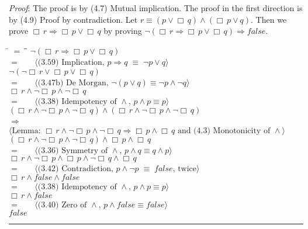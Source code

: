 \documentclass[12pt, fleqn, leqno]{article}
\newcommand{\lgap}{2pt}                             %
\newcommand{\mymathindent}{24pt}                    %
\newcommand{\equivs}{\ensuremath{\;\equiv\;}}       %
\newcommand{\impl}{\ensuremath{\Rightarrow}}        %
\newcommand{\Always}{\Box\,}
\newcommand{\myqed}{\rule[-.23ex]{1.2ex}{2.0ex}}
\newcommand{\myqedtab}{\hspace{384pt}}              %
\newcommand{\Gll} {\langle}                         %
\newcommand{\Ggg} {\rangle}                         %
\newcommand{\Hint}[1]     {\ \ \ $\Gll              \mbox{#1} \Ggg$ }   %
\begin{document}
\emph{Proof}: The proof is by (4.7) Mutual implication.
The proof in the first direction is by (4.9) Proof by contradiction. Let $r \equiv (p \lor \Always q) \land (\Always p \lor q)$.
Then we prove $\Always r \impl \Always p \lor \Always q$ by proving
$\neg (\Always r \impl \Always p \lor \Always q ) \impl false$.

\begin{tabbing}
\hspace{\mymathindent} \= $= \;$ \= \myqedtab \= \kill
  \> \>   $\neg (\Always r \impl \Always p \lor \Always q )$\\[\lgap]
  \> $=$  \>  \Hint{(3.59) Implication, $p\impl q \equivs \neg p \lor q$}\\[\lgap]
 \> \>   $\neg(\neg \Always r \lor \Always p \lor \Always q)$\\[\lgap]
  \> $=$  \>  \Hint{(3.47b) De Morgan, $\neg (p \lor q) \equiv \neg p \land \neg q$}\\[\lgap]
  \> \>   $\Always r \land \neg \Always p \land \neg \Always q$\\[\lgap]
   \> $=$  \>  \Hint{(3.38) Idempotency of $\land$, $p\land p \equiv p$}\\[\lgap]
  \> \>   $(\Always r \land \neg \Always p \land \neg \Always q ) \land (\Always r \land \neg \Always p \land \neg \Always q )$\\[\lgap]
   \> $\impl$  \>  \Hint{Lemma: $\Always r \land \neg \Always p \land \neg \Always q \impl \Always p \land \Always q$ and (4.3) Monotonicity of $\land$}\\[\lgap]
  \> \>   $(\Always r \land \neg \Always p \land \neg \Always q ) \land \Always p \land \Always q$\\[\lgap]
   \> $=$  \>  \Hint{(3.36) Symmetry of $\land$, $p\land q \equiv q\land p$}\\[\lgap]
  \> \>   $\Always r \land \neg \Always p \land \Always p \land  \neg \Always q \land \Always q $\\[\lgap]
    \> $=$  \>  \Hint{(3.42) Contradiction, $p\land\neg p \equivs false$, twice}\\[\lgap]
  \> \>   $\Always r \land false \land false $\\[\lgap]
  \> $=$  \>  \Hint{(3.38) Idempotency of $\land$, $p\land p \equiv p$}\\[\lgap]
  \> \>   $\Always r \land false$\\[\lgap]
   \> $=$  \>  \Hint{(3.40) Zero of $\land$, $p\land false\equiv false$}\\[\lgap]
  \> \>   $false$ \quad \myqed
\end{tabbing}
\end{document}
